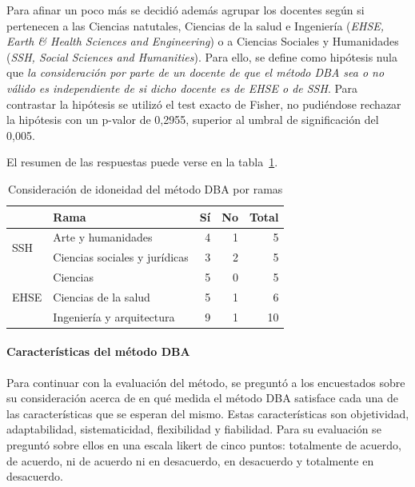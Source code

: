 Para afinar un poco más se decidió además agrupar los docentes según si pertenecen a las Ciencias natutales, Ciencias de la salud e Ingeniería (\emph{EHSE, Earth \& Health Sciences and Engineering}) o a Ciencias Sociales y Humanidades (\emph{SSH, Social Sciences and Humanities}). Para ello, se define como hipótesis nula que \emph{la consideración por parte de un docente de que el método DBA sea o no válido es independiente de si  dicho docente es de EHSE o de SSH}. Para contrastar la hipótesis se utilizó el test exacto de Fisher, no pudiéndose rechazar la hipótesis con un p-valor de 0,2955, superior al umbral de significación del 0,005.

El resumen de las respuestas puede verse en la tabla~\ref{tab:cap:encuesta:metodoDBA:rama}.

\begin{table}
  \begin{center}
  \begin{tabular}{| l | l | r | r | r |}
    \hline
    & Rama & Sí & No & Total \\
    \hline
    \hline
    \multirow{2}{2.5cm}{SSH} & Arte y humanidades & 4 & 1 & 5  \\
    \cline{2-5}
    & Ciencias sociales y jurídicas & 3 & 2 & 5  \\
    \hline
    \multirow{3}{2.5cm}{EHSE} & Ciencias & 5 & 0 & 5  \\
    \cline{2-5}
    & Ciencias de la salud & 5 & 1 & 6  \\
    \cline{2-5}
    & Ingeniería y arquitectura & 9 & 1 & 10 \\
    \hline
  \end{tabular}
\end{center}
\caption{Consideración de idoneidad del método DBA por ramas}
\label{tab:cap:encuesta:metodoDBA:rama}
\end{table}

\paragraph{Características del método DBA}

Para continuar con la evaluación del método, se preguntó a los encuestados sobre su consideración acerca de en qué medida el método DBA satisface cada una de las características que se esperan del mismo. Estas características son objetividad, adaptabilidad, sistematicidad, flexibilidad y fiabilidad. Para su evaluación se preguntó sobre ellos en una escala likert de cinco puntos: totalmente de acuerdo, de acuerdo, ni de acuerdo ni en desacuerdo, en desacuerdo y totalmente en desacuerdo. 

